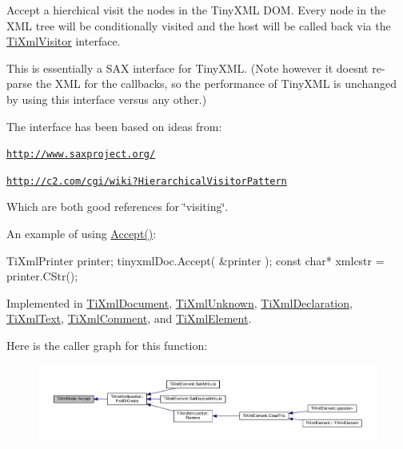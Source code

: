 Accept a hierchical visit the nodes in the Tiny\+X\+ML D\+OM. Every node in the X\+ML tree will be conditionally visited and the host will be called back via the \hyperlink{class_ti_xml_visitor}{Ti\+Xml\+Visitor} interface.

This is essentially a S\+AX interface for Tiny\+X\+ML. (Note however it doesn\textquotesingle{}t re-\/parse the X\+ML for the callbacks, so the performance of Tiny\+X\+ML is unchanged by using this interface versus any other.)

The interface has been based on ideas from\+:


\begin{DoxyItemize}
\item \href{http://www.saxproject.org/}{\tt http\+://www.\+saxproject.\+org/}
\item \href{http://c2.com/cgi/wiki?HierarchicalVisitorPattern}{\tt http\+://c2.\+com/cgi/wiki?\+Hierarchical\+Visitor\+Pattern}
\end{DoxyItemize}

Which are both good references for \char`\"{}visiting\char`\"{}.

An example of using \hyperlink{class_ti_xml_node_acc0f88b7462c6cb73809d410a4f5bb86}{Accept()}\+: \begin{DoxyVerb}TiXmlPrinter printer;
tinyxmlDoc.Accept( &printer );
const char* xmlcstr = printer.CStr();
\end{DoxyVerb}
 

Implemented in \hyperlink{class_ti_xml_document_a8ddd6eec722cbd25900bbac664909bac}{Ti\+Xml\+Document}, \hyperlink{class_ti_xml_unknown_aafdf1b2d4f561979c7907bad91004999}{Ti\+Xml\+Unknown}, \hyperlink{class_ti_xml_declaration_aa1b6bade6c989407ce9881bdfc73c1e6}{Ti\+Xml\+Declaration}, \hyperlink{class_ti_xml_text_af65964326eac4640bfb97d4622fa0de2}{Ti\+Xml\+Text}, \hyperlink{class_ti_xml_comment_ac894241530d1d266131a5026cb251a95}{Ti\+Xml\+Comment}, and \hyperlink{class_ti_xml_element_a01d33358cce9d1817b557d314dda3779}{Ti\+Xml\+Element}.

Here is the caller graph for this function\+:
\nopagebreak
\begin{figure}[H]
\begin{center}
\leavevmode
\includegraphics[width=350pt]{class_ti_xml_node_acc0f88b7462c6cb73809d410a4f5bb86_icgraph}
\end{center}
\end{figure}
\mbox{\label{class_ti_xml_node_a708e7f953df61d4d2d12f73171550a4b}} 
